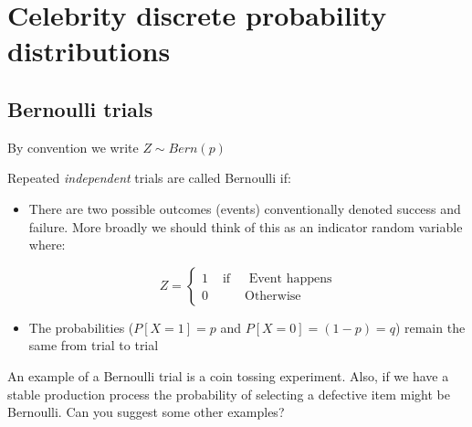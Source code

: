 \documentclass[12pt]{extbook}
\begin{document}
\chapter{Celebrity discrete probability distributions}



\section{Bernoulli trials}

{\color{green}By convention we write $Z \sim Bern(p)$}



Repeated \emph{independent} trials are called Bernoulli if:
\begin{itemize}
\item There are two possible outcomes (events) conventionally denoted success
  and failure.   More broadly we should think of this as an indicator random variable where:

\begin{displaymath}
Z = \left\{ \begin{array}{rrr} 1 & \mbox{ if } & \mbox{ Event happens} \\ 
0 & & \mbox{Otherwise} \end{array} \right.
\end{displaymath}
\item The probabilities ($P[X=1]=p$ and $P[X=0]=(1-p)=q$) remain the same from trial
  to trial
\end{itemize}

An example of a Bernoulli trial is a coin tossing experiment.   Also,
if we have a stable production process the probability of selecting a
defective item might be Bernoulli.   Can you suggest some other examples?
\end{document}
